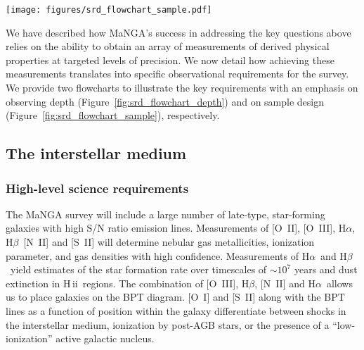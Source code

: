 \documentclass[preprint,11pt]{aastex}
\newcommand{\Halpha}{{H$\alpha$}}
\newcommand{\Hbeta}{{H$\beta$}}
\newcommand{\HII}{{\sc H\,ii}}
\begin{document}
\begin{figure*}
\begin{center}
\texttt{[image: figures/srd\_flowchart\_sample.pdf]}
\caption{Key science requirements flowdown structure. The red boxes above indicate the five categories of science questions we want to address, with the addition of protecting the discovery potential for unforeseen science; the green boxes indicate the high level science requirements; the blue boxes near the bottom indicate the resulting technical requirements on {\it sample selection}. The flowchart only contains the major requirements. The text provides a more complete list of requirements.}
\label{fig:srd_flowchart_sample}
\end{center}
\end{figure*}

We have described how MaNGA's success in addressing the key questions
above relies on the ability to obtain an array of measurements of
derived physical properties at targeted levels of precision.  We now
detail how achieving these measurements translates into specific
observational requirements for the survey. We provide two flowcharts
to illustrate the key requirements with an emphasis on observing depth
(Figure~\ref{fig:srd_flowchart_depth}) and on sample design
(Figure~\ref{fig:srd_flowchart_sample}), respectively.

\subsection{The interstellar medium}\label{sec:reqirements_ism}

\subsubsection{High-level science requirements}

The MaNGA survey will include a large number of late-type,
star-forming galaxies with high S/N ratio emission lines.
Measurements of [O~II], [O~III], \Halpha, \Hbeta\, [N~II] and [S~II]
will determine nebular gas metallicities, ionization parameter, and
gas densities with high confidence. Measurements of \Halpha\ and
\Hbeta\ yield estimates of the star formation rate over timescales of
$\sim$$10^7$ years and dust extinction in \HII\ regions.  The
combination of [O~III], \Hbeta, [N~II] and \Halpha\ allows us to place
galaxies on the BPT diagram. [O~I] and [S~II] along with the BPT lines
as a function of position within the galaxy differentiate between
shocks in the interstellar medium, ionization by post-AGB stars, or
the presence of a ``low-ionization'' active galactic nucleus.
\end{document}
